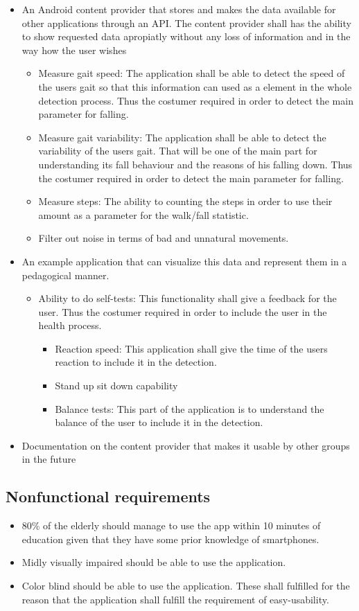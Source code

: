 \begin{itemize}
\item An Android content provider that stores and makes the data available for other applications through an API. The content provider shall has the ability to show requested data apropiatly without any loss of information and in the way how the user wishes
\begin{itemize}
\item Measure gait speed: The application shall be able to detect the speed of the users gait so that this information can used as a element in the whole detection process. Thus the costumer required in order to detect the main parameter for falling.
\item Measure gait variability: The application shall be able to detect the variability of the users gait. That will be one of the main part for understanding its fall behaviour and the reasons of his falling down. Thus the costumer required in order to detect the main parameter for falling.
\item Measure steps: The ability to counting the steps in order to use their amount as a parameter for the walk/fall statistic.
\item Filter out noise in terms of bad and unnatural movements.
\end{itemize}
\item An example application that can visualize this data and represent them in a pedagogical manner.
\begin{itemize}
\item Ability to do self-tests: This functionality shall give a feedback for the user. Thus the costumer required in order to include the user in the health process.
\begin{itemize}
\item Reaction speed: This application shall give the time of the users reaction to include it in the detection.
\item Stand up sit down capability
\item Balance tests: This part of the application is to understand the balance of the user to include it in the detection.
\end{itemize}
\end{itemize}
\item Documentation on the content provider that makes it usable by other groups in the future
\end{itemize}	

\subsection{Nonfunctional requirements}
\begin{itemize}
\item 80\% of the elderly should manage to use the app within 10 minutes of education given that they have some prior knowledge of smartphones.
\item Midly visually impaired should be able to use the application.
\item Color blind should be able to use the application. These shall fulfilled for the reason that the application shall fulfill the requirement of easy-usability.
\end{itemize}	


